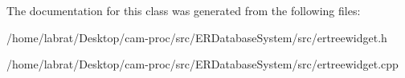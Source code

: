 The documentation for this class was generated from the following files\+:\begin{DoxyCompactItemize}
\item 
/home/labrat/\+Desktop/cam-\/proc/src/\+E\+R\+Database\+System/src/ertreewidget.\+h\item 
/home/labrat/\+Desktop/cam-\/proc/src/\+E\+R\+Database\+System/src/ertreewidget.\+cpp\end{DoxyCompactItemize}
